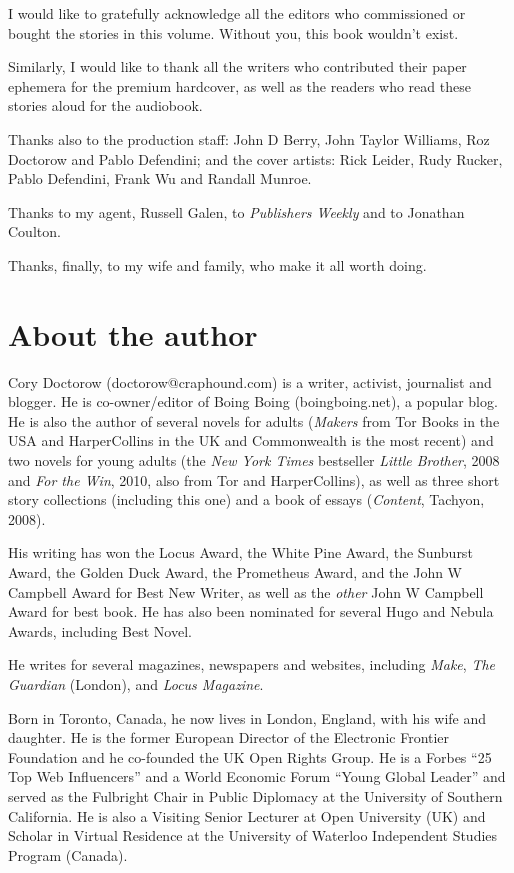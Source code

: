 I would like to gratefully acknowledge all the editors who commissioned 
or bought the stories in this volume. Without you, this book wouldn't 
exist.

Similarly, I would like to thank all the writers who contributed their 
paper ephemera for the premium hardcover, as well as the readers who 
read these stories aloud for the audiobook.

Thanks also to the production staff: John D Berry, John Taylor 
Williams, Roz Doctorow and Pablo Defendini; and the cover artists: Rick 
Leider, Rudy Rucker, Pablo Defendini, Frank Wu and Randall Munroe.

Thanks to my agent, Russell Galen, to \emph{Publishers Weekly} and to 
Jonathan Coulton.

Thanks, finally, to my wife and family, who make it all worth doing.

\section{About the author}

Cory Doctorow (doctorow@craphound.com) is a writer, activist, 
journalist and blogger. He is co-owner/editor of Boing Boing 
(boingboing.net), a popular blog. He is also the author of several 
novels for adults (\emph{Makers} from Tor Books in the USA and 
HarperCollins in the UK and Commonwealth is the most recent) and two 
novels for young adults (the \emph{New York Times} bestseller 
\emph{Little Brother}, 2008 and \emph{For the Win}, 2010, also from Tor 
and HarperCollins), as well as three short story collections (including 
this one) and a book of essays (\emph{Content}, Tachyon, 2008).

His writing has won the Locus Award, the White Pine Award, the Sunburst 
Award, the Golden Duck Award, the Prometheus Award, and the John W 
Campbell Award for Best New Writer, as well as the \emph{other} John W 
Campbell Award for best book. He has also been nominated for several 
Hugo and Nebula Awards, including Best Novel.

He writes for several magazines, newspapers and websites, including 
\emph{Make}, \emph{The Guardian} (London), and \emph{Locus Magazine}.

Born in Toronto, Canada, he now lives in London, England, with his wife 
and daughter. He is the former European Director of the Electronic 
Frontier Foundation and he co-founded the UK Open Rights Group. He is a 
Forbes “25 Top Web Influencers” and a World Economic Forum “Young 
Global Leader” and served as the Fulbright Chair in Public Diplomacy 
at the University of Southern California. He is also a Visiting Senior 
Lecturer at Open University (UK) and Scholar in Virtual Residence at 
the University of Waterloo Independent Studies Program (Canada).

